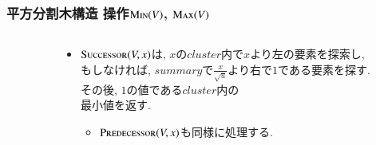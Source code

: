 \documentclass[main]{subfiles}
\begin{document}
\begin{frame}\frametitle{平方分割木構造 操作$\mathrm{\text{M\textsc{in}}}(V)$, $\mathrm{\text{M\textsc{ax}}}(V)$}
\begin{columns}[c]
\begin{column}{0.4\linewidth} \end{column}
\begin{column}{0.59\linewidth}
\begin{itemize}
\item {\small $\mathrm{\text{S\textsc{uccessor}}}(V,x)$}は, $x$の$cluster$内で$x$より左の要素を探索し,\\
	もしなければ, $summary$で$\frac{x}{\sqrt{u}}$より右で$1$である要素を探す.\\
	その後, $1$の値である$cluster$内の\\最小値を返す.
\begin{itemize}
	\item $\mathrm{\text{P\textsc{redecessor}}}(V,x)$も同様に処理する.
\end{itemize}
\end{itemize}
 \end{column}
\end{columns}

\end{frame}
\end{document}
